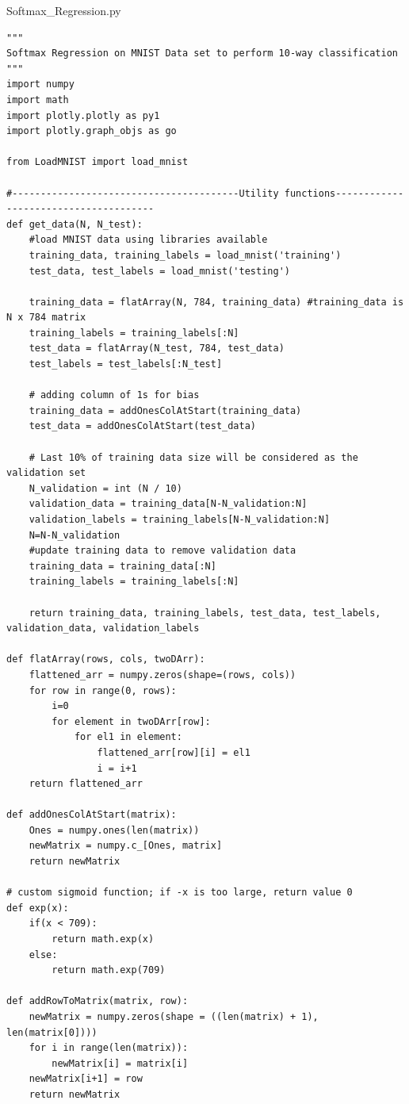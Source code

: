 \documentclass{article}
\begin{document}
Softmax_Regression.py
\begin{lstlisting}
"""
Softmax Regression on MNIST Data set to perform 10-way classification
"""
import numpy
import math
import plotly.plotly as py1
import plotly.graph_objs as go

from LoadMNIST import load_mnist

#----------------------------------------Utility functions--------------------------------------
def get_data(N, N_test):
    #load MNIST data using libraries available
    training_data, training_labels = load_mnist('training')    
    test_data, test_labels = load_mnist('testing')
    
    training_data = flatArray(N, 784, training_data) #training_data is N x 784 matrix
    training_labels = training_labels[:N]
    test_data = flatArray(N_test, 784, test_data)
    test_labels = test_labels[:N_test]

    # adding column of 1s for bias
    training_data = addOnesColAtStart(training_data)
    test_data = addOnesColAtStart(test_data)
    
    # Last 10% of training data size will be considered as the validation set
    N_validation = int (N / 10)
    validation_data = training_data[N-N_validation:N]
    validation_labels = training_labels[N-N_validation:N]
    N=N-N_validation
    #update training data to remove validation data
    training_data = training_data[:N]
    training_labels = training_labels[:N]    

    return training_data, training_labels, test_data, test_labels, validation_data, validation_labels
    
def flatArray(rows, cols, twoDArr):
    flattened_arr = numpy.zeros(shape=(rows, cols))
    for row in range(0, rows):
        i=0
        for element in twoDArr[row]:
            for el1 in element:
                flattened_arr[row][i] = el1            
                i = i+1
    return flattened_arr
    
def addOnesColAtStart(matrix):
    Ones = numpy.ones(len(matrix))
    newMatrix = numpy.c_[Ones, matrix]
    return newMatrix
    
# custom sigmoid function; if -x is too large, return value 0
def exp(x):
    if(x < 709):
        return math.exp(x)
    else:
        return math.exp(709)
        
def addRowToMatrix(matrix, row):
    newMatrix = numpy.zeros(shape = ((len(matrix) + 1), len(matrix[0])))
    for i in range(len(matrix)):
        newMatrix[i] = matrix[i]
    newMatrix[i+1] = row
    return newMatrix
    

\end{lstlisting}
\end{document}
